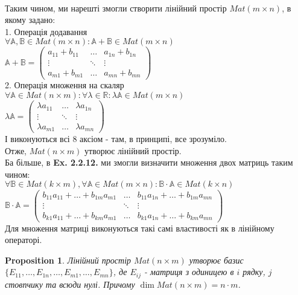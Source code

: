\documentclass[a4paper, 10pt]{article}
\theoremstyle{theoremdd}
\theoremstyle{theoremdd}
\theoremstyle{theoremdd}
\theoremstyle{theoremdd}
\theoremstyle{theoremdd}
\newtheorem{proposition}[theorem]{Proposition}
\theoremstyle{theoremdd}
\theoremstyle{theoremdd}
\theoremstyle{theoremdd}
\begin{document}
	\bigskip \\
	Таким чином, ми нарешті змогли створити лінійний простір $Mat(m \times n)$, в якому задано:\\
	1. Операція додавання\\
	$\forall \mathbb{A}, \mathbb{B} \in Mat(m \times n): \mathbb{A} + \mathbb{B} \in Mat(m \times n)$\\
	$\mathbb{A} + \mathbb{B} = \begin{pmatrix}
	a_{11} + b_{11} & \dots & a_{1n} + b_{1n} \\
	\vdots & \ddots & \vdots \\
	a_{m1} + b_{m1} & \dots & a_{mn} + b_{mn}
	\end{pmatrix}$\\
	2. Операція множення на скаляр\\
	$\forall \mathbb{A} \in Mat(n \times m): \forall \lambda \in \mathbb{R}: \lambda \mathbb{A} \in Mat(m \times n)$\\
	$\lambda \mathbb{A} = \begin{pmatrix}
	\lambda a_{11} & \dots & \lambda a_{1n}\\
	\vdots & \ddots & \vdots \\
	\lambda a_{m1} & \dots & \lambda a_{mn}
	\end{pmatrix}$\\
	І виконуються всі 8 аксіом - там, в принципі, все зрозуміло.\\
	Отже, $Mat (n \times m)$ утворює лінійний простір.
	\bigskip \\
	Ба більше, в \textbf{Ex. 2.2.12.} ми змогли визначити множення двох матриць таким чином:\\
	$\forall \mathbb{B} \in Mat(k \times m), \forall \mathbb{A} \in Mat(m \times n): \mathbb{B} \cdot \mathbb{A} \in Mat(k \times n)$\\
	$\mathbb{B} \cdot \mathbb{A} = \begin{pmatrix}
	b_{11}a_{11}+\dots+b_{1m}a_{m1} & \dots & b_{11}a_{1n}+\dots+b_{1m}a_{mn} \\
	\vdots & \ddots & \vdots \\
	b_{k1}a_{11} + \dots + b_{km}a_{m1} & \dots & b_{k1}a_{1n} + \dots + b_{km}a_{mn} 
	\end{pmatrix}$\\
	Для множення матриці виконуються такі самі властивості як в лінійному операторі.
	
	\begin{proposition}
	Лінійний простір $Mat(n \times m)$ утворює базис $\{E_{11},\dots, E_{1n},\dots, E_{m1}, \dots, E_{mn}\}$, де $E_{ij}$ - матриця з одиницею в $i$ рядку, $j$ стовпчику та всюди нулі. Причому $\dim Mat (n \times m) = n \cdot m$.
	\end{proposition}
	
\end{document}
